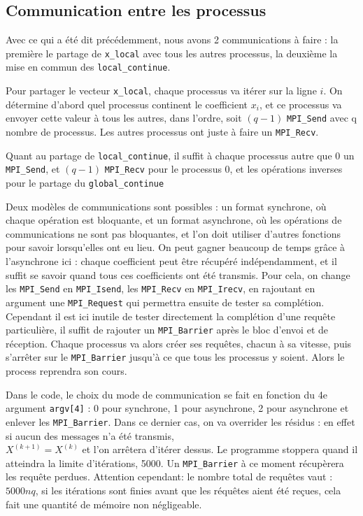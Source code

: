 \documentclass[11pt, a4paper]{article}
\begin{document}
\newpage
\subsection{Communication entre les processus}

Avec ce qui a été dit précédemment, nous avons 2 communications à faire :
la première le partage de \lstinline{x_local} avec tous les autres processus,
la deuxième la mise en commun des \lstinline{local_continue}.

\bigskip

Pour partager le vecteur \lstinline{x_local}, chaque processus va itérer sur la ligne \(i\).
On détermine d'abord quel processus continent le coefficient \(x_i\),
et ce processus va envoyer cette valeur à tous les autres, dans l'ordre,
soit \((q-1)\) \lstinline{MPI_Send} avec q nombre de processus.
Les autres processus ont juste à faire un \lstinline{MPI_Recv}.

Quant au partage de \lstinline{local_continue},
il suffit à chaque processus autre que 0 un \lstinline{MPI_Send}, et
\((q-1)\) \lstinline{MPI_Recv} pour le processus 0, et les opérations inverses
pour le partage du \lstinline{global_continue}

\bigskip

Deux modèles de communications sont possibles : un format synchrone,
où chaque opération est bloquante, et un format asynchrone, où les opérations
de communications ne sont pas bloquantes, et l'on doit utiliser d'autres fonctions
pour savoir lorsqu'elles ont eu lieu.
On peut gagner beaucoup de temps grâce à l'asynchrone ici :
chaque coefficient peut être récupéré indépendamment, et il suffit se savoir
quand tous ces coefficients ont été transmis.
Pour cela, on change les \lstinline{MPI_Send} en \lstinline{MPI_Isend},
les \lstinline{MPI_Recv} en \lstinline{MPI_Irecv}, en rajoutant en argument
une \lstinline{MPI_Request} qui permettra ensuite de tester sa complétion.
Cependant il est ici inutile de tester directement la complétion d'une requête particulière,
il suffit de rajouter un \lstinline{MPI_Barrier} après le bloc d'envoi et de réception.
Chaque processus va alors créer ses requêtes, chacun à sa vitesse, puis s'arrêter sur le \lstinline{MPI_Barrier} jusqu'à ce que tous les processus y soient.
Alors le process reprendra son cours.

\bigskip

Dans le code, le choix du mode de communication se fait en fonction du 4e argument \lstinline{argv[4]} : 0 pour synchrone, 1 pour asynchrone, 2 pour asynchrone et enlever les \lstinline{MPI_Barrier}.
Dans ce dernier cas, on va overrider les résidus : en effet si aucun des messages n'a été transmis, \\ \(X^{(k+1)} = X^{(k)} \) et l'on arrêtera d'itérer dessus.
Le programme stoppera quand il atteindra la limite d'itérations, 5000.
Un \lstinline{MPI_Barrier} à ce moment récupèrera les requête perdues.
Attention cependant: le nombre total de requêtes vaut : \( 5000nq \), si les itérations sont finies avant que les réquêtes aient été reçues, cela fait une quantité de mémoire non négligeable.
\newpage
\end{document}
